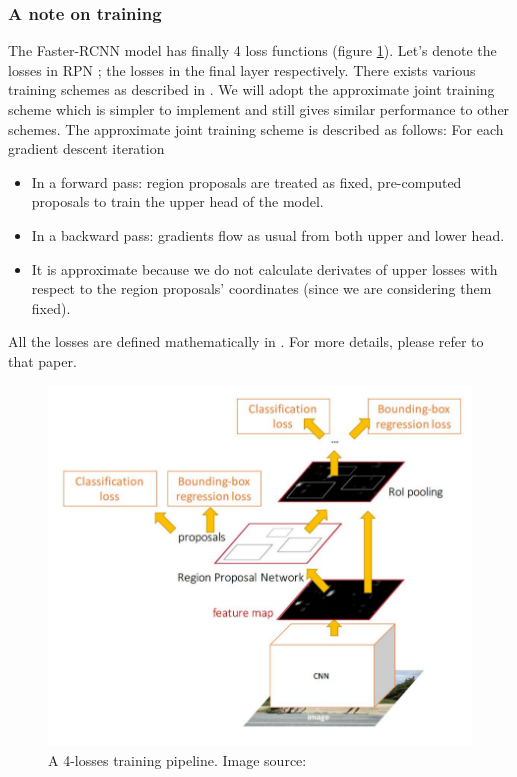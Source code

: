 \subsubsection{A note on training}
The Faster-RCNN model has finally 4 loss functions (figure \ref{fig:lossFasterRCNN}). Let's denote the losses in RPN ; the losses in the final layer  respectively. There exists various training schemes as described in \cite{DBLP:journals/corr/RenHG015}. We will adopt the approximate joint training scheme which is simpler to implement and still gives similar performance to other schemes. The approximate joint training scheme is described as follows: 
For each gradient descent iteration
\begin{itemize}
	\item In a forward pass: region proposals are treated as fixed, pre-computed proposals to train the upper head of the model.
	\item In a backward pass: gradients flow as usual from both upper and lower head. 
	\item It is approximate because we do not calculate derivates of upper losses with respect to the region proposals' coordinates (since we are considering them fixed).
\end{itemize}
All the losses are defined mathematically in \cite{DBLP:journals/corr/RenHG015}. For more details, please refer to that paper.

\begin{figure}[tb]
	\centering
	\includegraphics[width=0.8\hsize]{./figures/lossFasterRCNN}
	\caption{A 4-losses training pipeline. Image source: \cite{cs231n}}
	\label{fig:lossFasterRCNN}
\end{figure}

